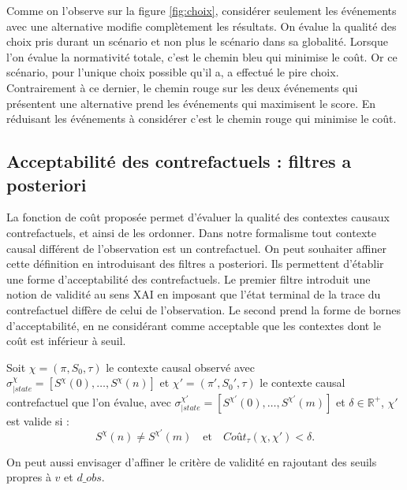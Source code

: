  Comme on l'observe sur la figure \ref{fig:choix}, considérer seulement les événements avec une alternative modifie complètement les résultats. On évalue la qualité des choix pris durant un scénario et non plus le scénario dans sa globalité. Lorsque l'on évalue la normativité totale, c'est le chemin bleu qui minimise le coût. Or ce scénario, pour l'unique choix possible qu'il a, a effectué le pire choix. Contrairement à ce dernier, le chemin rouge sur les deux événements qui présentent une alternative prend les événements qui maximisent le score. En réduisant les événements à considérer c'est le chemin rouge qui minimise le coût.


\subsection{Acceptabilité des contrefactuels : filtres a posteriori}

La fonction de coût proposée permet d'évaluer la qualité des contextes causaux contrefactuels, et ainsi de les ordonner. Dans notre formalisme tout contexte causal différent de l'observation est un contrefactuel. On peut souhaiter affiner cette définition en introduisant des filtres a posteriori. Ils permettent d'établir une forme d'acceptabilité des contrefactuels. Le premier filtre introduit une notion de validité au sens XAI en imposant que l'état terminal de la trace du contrefactuel diffère de celui de l'observation. Le second prend la forme de bornes d'acceptabilité, en ne considérant comme acceptable que les contextes dont le coût est inférieur à seuil.

Soit $\chi= (\pi,S_0,\tau)$ le contexte causal observé avec $\sigma_{|state}^\chi = [S^\chi(0),\dots,S^\chi(n)]$ et $\chi'= (\pi',S_0',\tau)$ le contexte causal contrefactuel que l'on évalue, avec $\sigma_{|state}^{\chi'} = [S^{\chi'}(0),\dots,S^{\chi'}(m)]$ et $\delta \in \mathds{R}^+$, $\chi'$ est valide si :
\begin{equation}
    S^\chi(n) \neq S^{\chi'}(m) \quad \text{et} \quad \textit{Coût}_\tau(\chi,\chi')<\delta.
\end{equation}

On peut aussi envisager d'affiner le critère de validité en rajoutant des seuils propres à $v$ et $d\_obs$.
